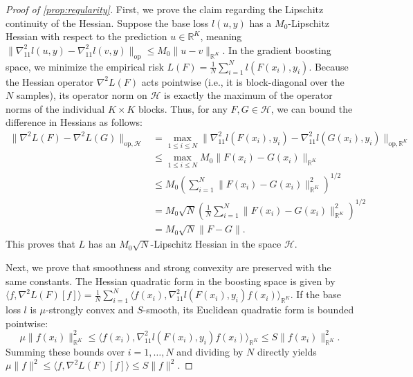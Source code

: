 \documentclass{article}
\theoremstyle{plain}
\theoremstyle{definition}
\theoremstyle{remark}
\begin{document}
\vspace{5pt}
\begin{proof}[Proof of \cref{prop:regularity}]
First, we prove the claim regarding the Lipschitz continuity of the Hessian. Suppose the base loss $l(u, y)$ has a $M_0$-Lipschitz Hessian with respect to the prediction $u \in \mathbb{R}^K$, meaning $\|\nabla_{11}^2 l(u, y) - \nabla_{11}^2 l(v, y)\|_{\text{op}} \leq M_0 \|u - v\|_{\mathbb{R}^K}$. In the gradient boosting space, we minimize the empirical risk $L(F) = \frac{1}{N} \sum_{i=1}^N l(F(x_i), y_i)$. Because the Hessian operator $\nabla^2 L(F)$ acts pointwise (i.e., it is block-diagonal over the $N$ samples), its operator norm on $\mathcal{H}$ is exactly the maximum of the operator norms of the individual $K \times K$ blocks. Thus, for any $F, G \in \mathcal{H}$, we can bound the difference in Hessians as follows:
\begin{align*}
    \|\nabla^2 L(F) - \nabla^2 L(G)\|_{\text{op}, \mathcal{H}} 
    &= \max_{1 \leq i \leq N} \|\nabla_{11}^2 l(F(x_i), y_i) - \nabla_{11}^2 l(G(x_i), y_i)\|_{\text{op}, \mathbb{R}^K} \\
    &\leq \max_{1 \leq i \leq N} M_0 \|F(x_i) - G(x_i)\|_{\mathbb{R}^K} \\
    &\leq M_0 \left( \sum_{i=1}^N \|F(x_i) - G(x_i)\|_{\mathbb{R}^K}^2 \right)^{1/2} \\
    &= M_0 \sqrt{N} \left( \frac{1}{N}\sum_{i=1}^N \|F(x_i) - G(x_i)\|_{\mathbb{R}^K}^2 \right)^{1/2} \\
    &= M_0 \sqrt{N} \|F - G\|.
\end{align*}
This proves that $L$ has an $M_0\sqrt{N}$-Lipschitz Hessian in the space $\mathcal{H}$.

Next, we prove that smoothness and strong convexity are preserved with the same constants. The Hessian quadratic form in the boosting space is given by $\langle f, \nabla^2 L(F)[f] \rangle = \frac{1}{N} \sum_{i=1}^N \langle f(x_i), \nabla_{11}^2 l(F(x_i), y_i) f(x_i) \rangle_{\mathbb{R}^K}$. If the base loss $l$ is $\mu$-strongly convex and $S$-smooth, its Euclidean quadratic form is bounded pointwise:
\begin{equation*}
    \mu \|f(x_i)\|_{\mathbb{R}^K}^2 \leq \langle f(x_i), \nabla_{11}^2 l(F(x_i), y_i) f(x_i) \rangle_{\mathbb{R}^K} \leq S \|f(x_i)\|_{\mathbb{R}^K}^2.
\end{equation*}
Summing these bounds over $i=1, \dots, N$ and dividing by $N$ directly yields $\mu \|f\|^2 \leq \langle f, \nabla^2 L(F)[f] \rangle \leq S \|f\|^2$.
\end{proof}
\end{document}
